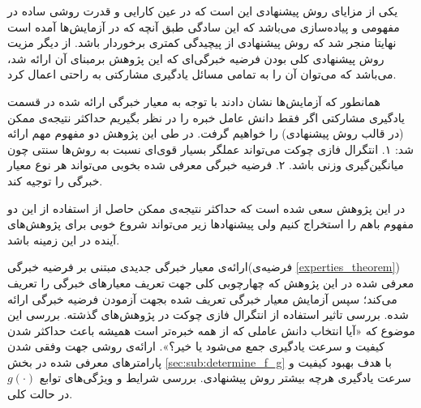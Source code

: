 یکی از مزایای روش پیشنهادی این است که در عین کارایی و قدرت روشی ساده در مفهومی و پیاده‌سازی می‌باشد که این سادگی طبق آنچه که در آزمایش‌ها آمده است نهایتا منجر شد که روش پیشنهادی از پیچیدگی کمتری برخوردار باشد. از دیگر مزیت روش پیشنهادی کلی بودن فرضیه خبرگی‌ای که این پژوهش برمبنای آن ارائه شد، می‌باشد که می‌توان آن را به تمامی مسائل یادگیری مشارکتی به راحتی اعمال کرد.

همانطور که آزمایش‌ها نشان دادند با توجه به معیار خبرگی ارائه شده در قسمت یادگیری مشارکتی اگر فقط دانش عامل خبره را در نظر بگیریم حداکثر نتیجه‌ی ممکن (در قالب روش پیشنهادی) را خواهیم گرفت. در طی این پژوهش دو مفهوم مهم ارائه شد: ۱. انتگرال فازی چوکت می‌تواند عملگر بسیار قوی‌ای نسبت به روش‌ها سنتی چون میانگین‌گیری وزنی باشد. ۲. فرضیه خبرگی معرفی شده بخوبی می‌تواند هر نوع معیار خبرگی را توجیه کند.

در این پژوهش سعی شده است که حداکثر نتیجه‌ی ممکن حاصل از استفاده از این دو مفهوم باهم را استخراج کنیم ولی پیشنهادها زیر می‌تواند شروع خوبی برای پژوهش‌های آینده در این زمینه باشد.

\begin{enumerate}
 ارائه‌ی معیار خبرگی جدیدی مبتنی بر فرضیه خبرگی(فرضیه‌ی \ref{experties_theorem}) معرفی شده در این پژوهش که چهارچوبی کلی جهت تعریف معیارهای خبرگی را تعریف می‌کند؛ سپس آزمایش معیار خبرگی تعریف شده بجهت آزمودن فرضیه خبرگی ارائه شده.
 بررسی تاثیر استفاده از انتگرال فازی چوکت در پژوهش‌های گذشته.
 بررسی این موضوع که «آیا انتخاب دانش عاملی که از همه خبره‌تر است همیشه باعث حداکثر شدن کیفیت و سرعت یادگیری جمع می‌شود یا خیر؟».
 ارائه‌ی روشی جهت وفقی شدن پارامترهای معرفی شده در بخش \ref{sec:sub:determine_f_g} با هدف بهبود کیفیت و سرعت یادگیری هرچه بیشتر روش پیشنهادی.
 بررسی شرایط و ویژگی‌های توابع $g(\cdot)$ در حالت کلی.
\end{enumerate}
